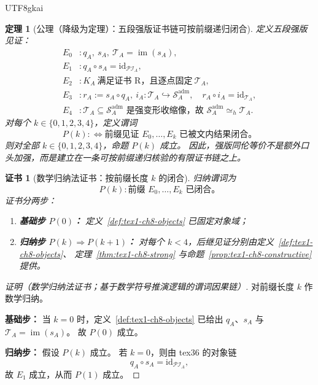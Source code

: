 \documentclass[12pt]{article}
\newtheorem{theorem}{定理}[section]
\newtheorem{Certificate}{证书}[section]
\newcommand{\id}{\mathrm{id}}
\begin{document}
\begin{CJK*}{UTF8}{gkai}
\begin{theorem}[公理（降级为定理）：五段强版证书链可按前缀递归闭合]
\label{thm:tex1-ch8-axiom-downgraded}
定义五段强版见证：
\[
\begin{aligned}
  E_0 &: q_A,\ s_A,\ \mathcal T_A=\operatorname{im}(s_A),\\
  E_1 &: q_A\circ s_A=\id_{\mathcal{PI}_A},\\
  E_2 &: K_A\ \text{满足证书 R，且逐点固定}\ \mathcal T_A,\\
  E_3 &: r_A:=s_A\circ q_A,\ i_A:\mathcal T_A\hookrightarrow \mathcal S_A^{\mathrm{adm}},
         \quad
         r_A\circ i_A=\id_{\mathcal T_A},\\
  E_4 &: \mathcal T_A\subseteq \mathcal S_A^{\mathrm{adm}}
         \text{ 是强变形收缩像，故 }
         \mathcal S_A^{\mathrm{adm}}\simeq_h\mathcal T_A.
\end{aligned}
\]
对每个 \(k\in\{0,1,2,3,4\}\)，定义谓词
\[
  P(k)
  :\Longleftrightarrow
  \text{前缀见证 }E_0,\dots,E_k\text{ 已被文内结果闭合。}
\]
则对全部 \(k\in\{0,1,2,3,4\}\)，命题 \(P(k)\) 成立。
因此，强版同伦等价不是额外口头加强，而是建立在一条可按前缀递归核验的有限证书链之上。
\end{theorem}

\begin{Certificate}[数学归纳法证书：按前缀长度 \(k\) 的闭合]
\label{cert:tex1-ch8-axiom-downgraded}
归纳谓词为
\[
  P(k):
  \text{前缀 }E_0,\dots,E_k\text{ 已闭合。}
\]
证书分两步：
\begin{enumerate}
  \item \textbf{基础步 \(P(0)\)：}
  定义~\ref{def:tex1-ch8-objects} 已固定对象域；
  \item \textbf{归纳步 \(P(k)\Rightarrow P(k+1)\)：}
  对每个 \(k<4\)，后继见证分别由定义~\ref{def:tex1-ch8-objects}、
  定理~\ref{thm:tex1-ch8-strong} 与命题~\ref{prop:tex1-ch8-constructive}
  提供。
\end{enumerate}
\end{Certificate}

\begin{proof}[证明（数学归纳法证书；基于数学符号推演逻辑的谓词因果链）]
对前缀长度 \(k\) 作数学归纳。

\textbf{基础步：}
当 \(k=0\) 时，定义~\ref{def:tex1-ch8-objects} 已给出 \(q_A\)、\(s_A\) 与 \(\mathcal T_A=\operatorname{im}(s_A)\)。
故 \(P(0)\) 成立。

\textbf{归纳步：}
假设 \(P(k)\) 成立。
若 \(k=0\)，则由 tex36 的对象链
\[
  q_A\circ s_A=\id_{\mathcal{PI}_A},
\]
故 \(E_1\) 成立，从而 \(P(1)\) 成立。


\end{proof}
\end{CJK*}
\end{document}

